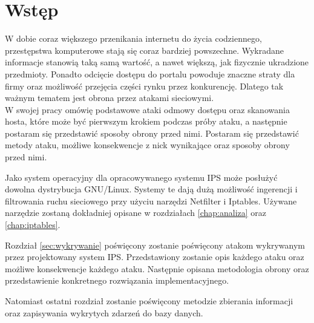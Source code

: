 \chapter*{Wstęp}
	W dobie coraz większego przenikania internetu do życia codziennego, przestępstwa komputerowe stają się coraz bardziej powszechne.
	Wykradane informacje stanowią taką samą wartość, a nawet większą, jak fizycznie ukradzione przedmioty.
	Ponadto odcięcie dostępu do portalu powoduje znaczne straty dla firmy oraz możliwość przejęcia części rynku przez konkurencję.
	Dlatego tak ważnym tematem jest obrona przez atakami sieciowymi.\\
	W swojej pracy omówię podstawowe ataki odmowy dostępu oraz skanowania hosta, które może być pierwszym krokiem podczas próby ataku, a następnie postaram się przedstawić sposoby obrony przed nimi.
	Postaram się przedstawić metody ataku, możliwe konsekwencje z nick wynikające oraz sposoby obrony przed nimi.

	Jako system operacyjny dla opracowywanego systemu IPS może posłużyć dowolna dystrybucja GNU/Linux.
	Systemy te dają dużą możliwość ingerencji i filtrowania ruchu sieciowego przy użyciu narzędzi Netfilter i Iptables.
	Używane narzędzie zostaną dokładniej opisane w rozdziałach \ref{chap:analiza} oraz \ref{chap:iptables}.

	Rozdział \ref{sec:wykrywanie} poświęcony zostanie poświęcony atakom wykrywanym przez projektowany system IPS.
	Przedstawiony zostanie opis każdego ataku oraz możliwe konsekwencje każdego ataku.
	Następnie opisana metodologia obrony oraz przedstawienie konkretnego rozwiązania implementacyjnego.

	Natomiast ostatni rozdział zostanie poświęcony metodzie zbierania informacji oraz zapisywania wykrytych zdarzeń do bazy danych.
